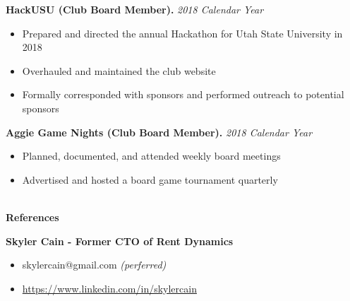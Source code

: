 \documentclass[letterpaper,11pt]{article}
\begin{document}
\textbf{HackUSU (Club Board Member).} \textit{2018 Calendar Year}
\begin{itemize}[noitemsep,topsep=0pt]
	\item Prepared and directed the annual Hackathon for Utah State University in 2018
	\item Overhauled and maintained the club website
	\item Formally corresponded with sponsors and performed outreach to potential sponsors\\
\end{itemize}

\textbf{Aggie Game Nights (Club Board Member).} \textit{2018 Calendar Year}
\begin{itemize}[noitemsep,topsep=0pt]
	\item Planned, documented, and attended weekly board meetings
	\item Advertised and hosted a board game tournament quarterly\\
\end{itemize}




\begin{Large}\textbf{\\References}\end{Large}

\textbf{Skyler Cain - Former CTO of Rent Dynamics}
\begin{itemize}[noitemsep,topsep=0pt]
	\item skylercain@gmail.com \textit{(perferred)}
	\item \url{https://www.linkedin.com/in/skylercain}\\
\end{itemize}
\end{document}
